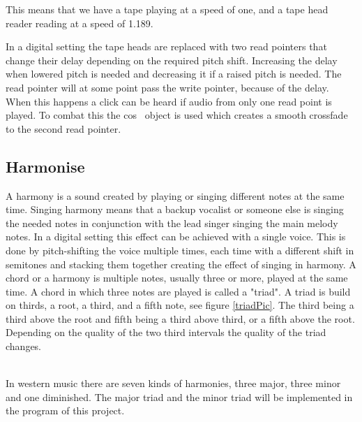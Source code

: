This means that we have a tape playing at a speed of one, and a tape head reader reading at a speed of 1.189. 

In a digital setting the tape heads are replaced with two read pointers that change their delay depending on the required pitch shift. Increasing the delay when lowered pitch is needed and decreasing it if a raised pitch is needed. 
The read pointer will at some point pass the write pointer, because of the delay. When this happens a click can be heard if audio from only one read point is played. To combat this the cos~ object is used which creates a smooth crossfade to the second read pointer.

\subsection{Harmonise}

A harmony is a sound created by playing or singing different notes at the same time\citep{Harmonise02}.
Singing harmony means that a backup vocalist or someone else is singing the needed notes in conjunction with the lead singer singing the main melody notes. In a digital setting this effect can be achieved with a single voice. This is done by pitch-shifting the voice multiple times, each time with a different shift in semitones and stacking them together creating the effect of singing in harmony. 
A chord or a harmony is multiple notes, usually three or more, played at the same time. A chord in which three notes are played is called a "triad"\citep{Harmonise01}. A triad is build on thirds, a root, a third, and a fifth note, see figure \ref{triadPic}. The third being a third above the root and fifth being a third above third, or a fifth above the root. Depending on the quality of the two third intervals the quality of the triad changes. \\

\begin{minipage}{\linewidth}%
\label{triadPic}
\end{minipage}\\

In western music there are seven kinds of harmonies, three major, three minor and one diminished. The major triad and the minor triad will be implemented in the program of this project.